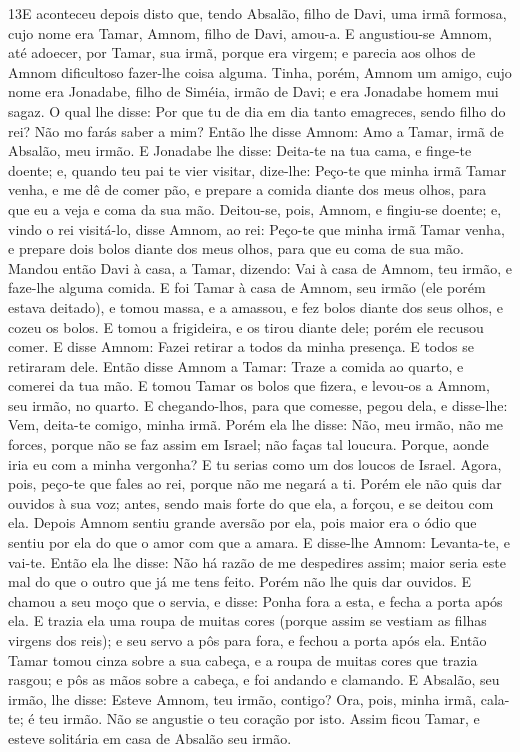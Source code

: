 \lettrine{13} E aconteceu depois disto que, tendo Absalão,
filho de Davi, uma irmã formosa, cujo nome era Tamar, Amnom, filho
de Davi, amou-a. E angustiou-se Amnom, até adoecer, por Tamar,
sua irmã, porque era virgem; e parecia aos olhos de Amnom
dificultoso fazer-lhe coisa alguma. Tinha, porém, Amnom um
amigo, cujo nome era Jonadabe, filho de Siméia, irmão de Davi; e era
Jonadabe homem mui sagaz. O qual lhe disse: Por que tu de dia em
dia tanto emagreces, sendo filho do rei? Não mo farás saber a mim?
Então lhe disse Amnom: Amo a Tamar, irmã de Absalão, meu irmão.
E Jonadabe lhe disse: Deita-te na tua cama, e finge-te doente;
e, quando teu pai te vier visitar, dize-lhe: Peço-te que minha irmã
Tamar venha, e me dê de comer pão, e prepare a comida diante dos
meus olhos, para que eu a veja e coma da sua mão. Deitou-se,
pois, Amnom, e fingiu-se doente; e, vindo o rei visitá-lo, disse
Amnom, ao rei: Peço-te que minha irmã Tamar venha, e prepare dois
bolos diante dos meus olhos, para que eu coma de sua mão. Mandou
então Davi à casa, a Tamar, dizendo: Vai à casa de Amnom, teu irmão,
e faze-lhe alguma comida. E foi Tamar à casa de Amnom, seu irmão
(ele porém estava deitado), e tomou massa, e a amassou, e fez bolos
diante dos seus olhos, e cozeu os bolos. E tomou a frigideira, e
os tirou diante dele; porém ele recusou comer. E disse Amnom: Fazei
retirar a todos da minha presença. E todos se retiraram dele.
Então disse Amnom a Tamar: Traze a comida ao quarto, e
comerei da tua mão. E tomou Tamar os bolos que fizera, e levou-os a
Amnom, seu irmão, no quarto. E chegando-lhos, para que
comesse, pegou dela, e disse-lhe: Vem, deita-te comigo, minha irmã.
Porém ela lhe disse: Não, meu irmão, não me forces, porque
não se faz assim em Israel; não faças tal loucura. Porque,
aonde iria eu com a minha vergonha? E tu serias como um dos loucos
de Israel. Agora, pois, peço-te que fales ao rei, porque não me
negará a ti. Porém ele não quis dar ouvidos à sua voz; antes,
sendo mais forte do que ela, a forçou, e se deitou com ela.
Depois Amnom sentiu grande aversão por ela, pois maior era o
ódio que sentiu por ela do que o amor com que a amara. E disse-lhe
Amnom: Levanta-te, e vai-te. Então ela lhe disse: Não há
razão de me despedires assim; maior seria este mal do que o outro
que já me tens feito. Porém não lhe quis dar ouvidos. E
chamou a seu moço que o servia, e disse: Ponha fora a esta, e fecha
a porta após ela. E trazia ela uma roupa de muitas cores
(porque assim se vestiam as filhas virgens dos reis); e seu servo a
pôs para fora, e fechou a porta após ela. Então Tamar tomou
cinza sobre a sua cabeça, e a roupa de muitas cores que trazia
rasgou; e pôs as mãos sobre a cabeça, e foi andando e clamando.
E Absalão, seu irmão, lhe disse: Esteve Amnom, teu irmão,
contigo? Ora, pois, minha irmã, cala-te; é teu irmão. Não se
angustie o teu coração por isto. Assim ficou Tamar, e esteve
solitária em casa de Absalão seu irmão.

